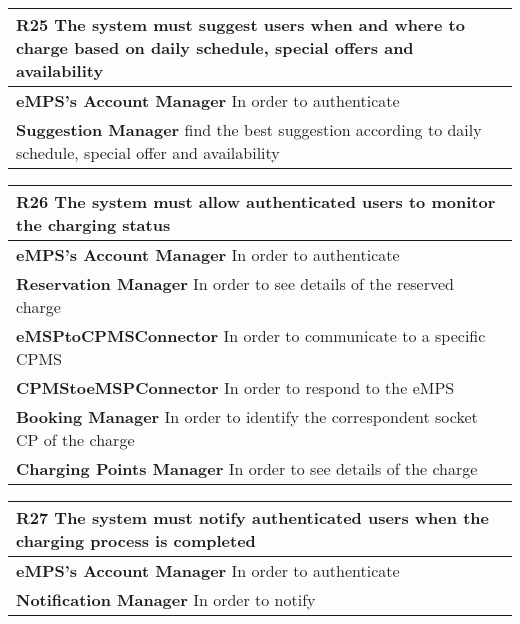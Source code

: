 \begin{table}[H]
    \begin{tabularx}{\textwidth}{X}
        \toprule
        \textbf{R25} The system must suggest users when and where to charge based on daily
        schedule, special offers and availability                                                                        \\ \midrule
        \textbf{eMPS's Account Manager} In order to authenticate                                                         \\
        \textbf{Suggestion Manager} find the best suggestion according to daily schedule, special offer and availability \\
    \end{tabularx}
\end{table}
\begin{table}[H]
    \begin{tabularx}{\textwidth}{X}
        \toprule
        \textbf{R26} The system must allow authenticated users to monitor the charging status   \\ \midrule
        \textbf{eMPS's Account Manager} In order to authenticate                                \\
        \textbf{Reservation Manager} In order to see details of the reserved charge           \\
        \textbf{eMSPtoCPMSConnector} In order to communicate to a specific CPMS                 \\
        \textbf{CPMStoeMSPConnector} In order to respond to the eMPS                            \\
        \textbf{Booking Manager} In order to identify the correspondent socket CP of the charge \\
        \textbf{Charging Points Manager} In order to see details of the charge                  \\
    \end{tabularx}
\end{table}
\begin{table}[H]
    \begin{tabularx}{\textwidth}{X}
        \toprule
        \textbf{R27} The system must notify authenticated users when the charging process is completed \\ \midrule
        \textbf{eMPS's Account Manager} In order to authenticate                                       \\
        \textbf{Notification Manager} In order to notify                                               \\
    \end{tabularx}
\end{table}
